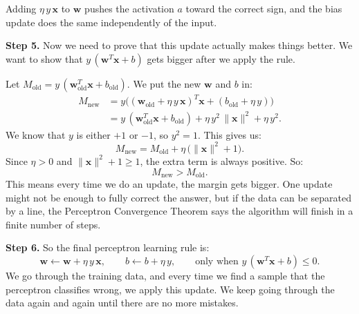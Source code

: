 \documentclass[12pt, a4paper]{article}
\begin{document}
Adding $\eta\,y\,\mathbf{x}$ to $\mathbf{w}$ pushes the activation $a$ toward the correct sign, and the bias update does the same independently of the input.

\bigskip

\noindent\textbf{Step 5.}
Now we need to prove that this update actually makes things better.  We want to show that $y\,(\mathbf{w}^{T}\mathbf{x}+b)$ gets bigger after we apply the rule.

Let $M_{\text{old}} = y\,(\mathbf{w}_{\text{old}}^{T}\mathbf{x}+b_{\text{old}})$.  We put the new $\mathbf{w}$ and $b$ in:
\begin{align*}
M_{\text{new}}
&= y\bigl((\mathbf{w}_{\text{old}}+\eta\,y\,\mathbf{x})^{T}\mathbf{x}
   + (b_{\text{old}}+\eta\,y)\bigr) \\[4pt]
&= y\,(\mathbf{w}_{\text{old}}^{T}\mathbf{x}+b_{\text{old}})
   + \eta\,y^{2}\,\|\mathbf{x}\|^{2}
   + \eta\,y^{2}.
\end{align*}
We know that $y$ is either $+1$ or $-1$, so $y^{2}=1$.  This gives us:
\[
M_{\text{new}} = M_{\text{old}} + \eta\,\bigl(\|\mathbf{x}\|^{2}+1\bigr).
\]
Since $\eta>0$ and $\|\mathbf{x}\|^{2}+1 \geq 1$, the extra term is always positive.  So:
\[
\boxed{M_{\text{new}} > M_{\text{old}}.}
\]
This means every time we do an update, the margin gets bigger.  One update might not be enough to fully correct the answer, but if the data can be separated by a line, the Perceptron Convergence Theorem says the algorithm will finish in a finite number of steps.

\bigskip

\noindent\textbf{Step 6.}
So the final perceptron learning rule is:
\[
\boxed{\mathbf{w} \leftarrow \mathbf{w} + \eta\, y\, \mathbf{x},
\qquad
b \leftarrow b + \eta\, y,
\qquad
\text{only when } y\,(\mathbf{w}^{T}\mathbf{x}+b)\leq 0.}
\]
We go through the training data, and every time we find a sample that the perceptron classifies wrong, we apply this update.  We keep going through the data again and again until there are no more mistakes.
\end{document}
